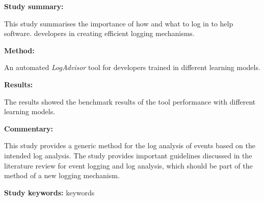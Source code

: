 \begin{tcolorbox}[colback=gray!5!white, colframe=pastelgreen!40!black, title=Learning to Log: Helping Developers Make Informed Logging Decisions \cite{Zhu2015}]
	\begin{minipage}[t]{0.25\textwidth}
		\textbf{Study summary:}
	\end{minipage}
	\hfill
	\begin{minipage}[t]{0.65\textwidth}
		This study summarises the importance of how and what to log in to help software.
		developers in creating efficient logging mechanisms. 
	\end{minipage}

	\vspace{0.75em} 

	\begin{minipage}[t]{0.25\textwidth}
		\textbf{Method:}
	\end{minipage}
	\hfill
	\begin{minipage}[t]{0.65\textwidth}
		An automated \textit{LogAdvisor} tool for developers trained in different learning models.
	\end{minipage}

	\vspace{0.75em} 

	\begin{minipage}[t]{0.25\textwidth}
		\textbf{Results:}
	\end{minipage}
	\hfill
	\begin{minipage}[t]{0.65\textwidth}
		The results showed the benchmark results of the tool performance with different learning models.
	\end{minipage}

	\vspace{0.75em} 

	\begin{minipage}[t]{0.25\textwidth}
		\textbf{Commentary:}
	\end{minipage}
	\hfill
	\begin{minipage}[t]{0.65\textwidth}
		This study provides a generic method for the log analysis of events based on the intended log analysis.
		The study provides important guidelines discussed in the literature review for event logging
and log analysis, which should be part of the method of a new logging mechanism.
	\end{minipage}
	\tcblower
	\textbf{Study keywords:} keywords
\end{tcolorbox}

